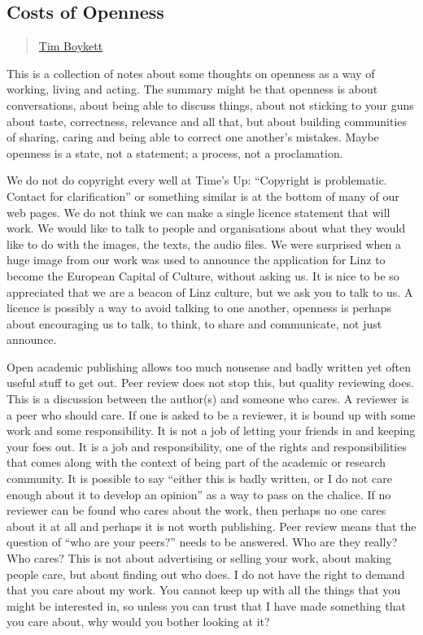 \subsection{Costs of Openness}\label{costs-of-openness}

\begin{quote}
\hyperlink{tim-boykett}{Tim Boykett}
\end{quote}

This is a collection of notes about some thoughts on openness as a way
of working, living and acting. The summary might be that openness is
about conversations, about being able to discuss things, about not
sticking to your guns about taste, correctness, relevance and all that,
but about building communities of sharing, caring and being able to
correct one another's mistakes. Maybe openness is a state, not a
statement; a process, not a proclamation.

We do not do copyright every well at Time's Up: ``Copyright is
problematic. Contact for clarification'' or something similar is at the
bottom of many of our web pages. We do not think we can make a single
licence statement that will work. We would like to talk to people and
organisations about what they would like to do with the images, the
texts, the audio files. We were surprised when a huge image from our
work was used to announce the application for Linz to become the
European Capital of Culture, without asking us. It is nice to be so
appreciated that we are a beacon of Linz culture, but we ask you to talk
to us. A licence is possibly a way to avoid talking to one another,
openness is perhaps about encouraging us to talk, to think, to share and
communicate, not just announce.

Open academic publishing allows too much nonsense and badly written yet
often useful stuff to get out. Peer review does not stop this, but
quality reviewing does. This is a discussion between the author(s) and
someone who cares. A reviewer is a peer who should care. If one is asked
to be a reviewer, it is bound up with some work and some responsibility.
It is not a job of letting your friends in and keeping your foes out. It
is a job and responsibility, one of the rights and responsibilities that
comes along with the context of being part of the academic or research
community. It is possible to say ``either this is badly written, or I do
not care enough about it to develop an opinion'' as a way to pass on the
chalice. If no reviewer can be found who cares about the work, then
perhaps no one cares about it at all and perhaps it is not worth
publishing. Peer review means that the question of ``who are your
peers?'' needs to be answered. Who are they really? Who cares? This is
not about advertising or selling your work, about making people care,
but about finding out who does. I do not have the right to demand that
you care about my work. You cannot keep up with all the things that you
might be interested in, so unless you can trust that I have made
something that you care about, why would you bother looking at it?

